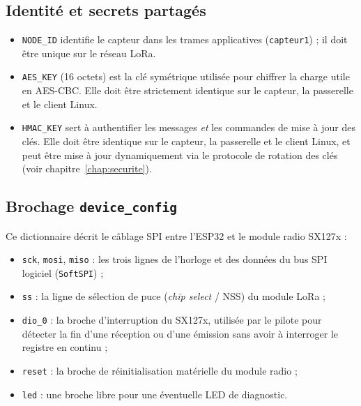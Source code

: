 \documentclass[a4paper,11pt]{report}
\begin{document}
\subsection{Identité et secrets partagés}
\begin{itemize}
    \item \texttt{NODE\_ID} identifie le capteur dans les trames applicatives (\texttt{capteur1}) ;
    il doit être unique sur le réseau LoRa.
    \item \texttt{AES\_KEY} (16 octets) est la clé symétrique utilisée pour chiffrer la charge utile en
    AES-CBC. Elle doit être strictement identique sur le capteur, la passerelle et le client Linux.
    \item \texttt{HMAC\_KEY} sert à authentifier les messages \emph{et} les commandes de mise à jour des
    clés. Elle doit être identique sur le capteur, la passerelle et le client Linux, et peut être mise
    à jour dynamiquement via le protocole de rotation des clés (voir chapitre~\ref{chap:securite}).
\end{itemize}

\subsection{Brochage \texttt{device\_config}}
Ce dictionnaire décrit le câblage SPI entre l'ESP32 et le module radio SX127x :
\begin{itemize}
    \item \texttt{sck}, \texttt{mosi}, \texttt{miso} : les trois lignes de l'horloge et des données du
    bus SPI logiciel (\texttt{SoftSPI}) ;
    \item \texttt{ss} : la ligne de sélection de puce (\emph{chip select} / NSS) du module LoRa ;
    \item \texttt{dio\_0} : la broche d'interruption du SX127x, utilisée par le pilote pour détecter la
    fin d'une réception ou d'une émission sans avoir à interroger le registre en continu ;
    \item \texttt{reset} : la broche de réinitialisation matérielle du module radio ;
    \item \texttt{led} : une broche libre pour une éventuelle LED de diagnostic.
\end{itemize}
\end{document}
